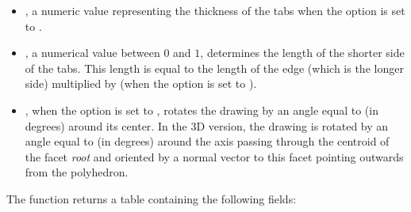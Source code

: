 \begin{itemize}
    \item {}, a numeric value representing the thickness of the tabs when the  option is set to \true.

    \item {}, a numerical value between $0$ and $1$, determines the length of the shorter side of the tabs. This length is equal to the length of the edge (which is the longer side) multiplied by  (when the  option is set to \true).

    \item {}, when the  option is set to \true, rotates the drawing by an angle equal to  (in degrees) around its center. In the 3D version, the drawing is rotated by an angle equal to  (in degrees) around the axis passing through the centroid of the facet \emph{root} and oriented by a normal vector to this facet pointing outwards from the polyhedron.
\end{itemize}



The function returns a table containing the following fields:

